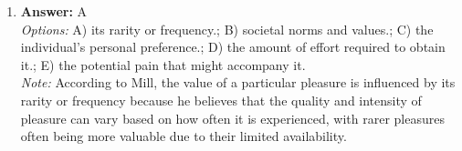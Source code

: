 \documentclass[12pt]{article}
\begin{document}
\begin{enumerate}[label=\arabic*.]
\\ \textit{Note:} In a hypothetical syllogism, if the minor premise affirms the antecedent, it logically leads to the conclusion affirming the consequent due to the structure of conditional reasoning, which states that if "If P, then Q" is true and P is affirmed, Q must also be affirmed.
\item \textbf{Answer:} A
\\ \textit{Options:} A) its rarity or frequency.; B) societal norms and values.; C) the individual's personal preference.; D) the amount of effort required to obtain it.; E) the potential pain that might accompany it.
\\ \textit{Note:} According to Mill, the value of a particular pleasure is influenced by its rarity or frequency because he believes that the quality and intensity of pleasure can vary based on how often it is experienced, with rarer pleasures often being more valuable due to their limited availability.
\end{enumerate}
\end{document}
